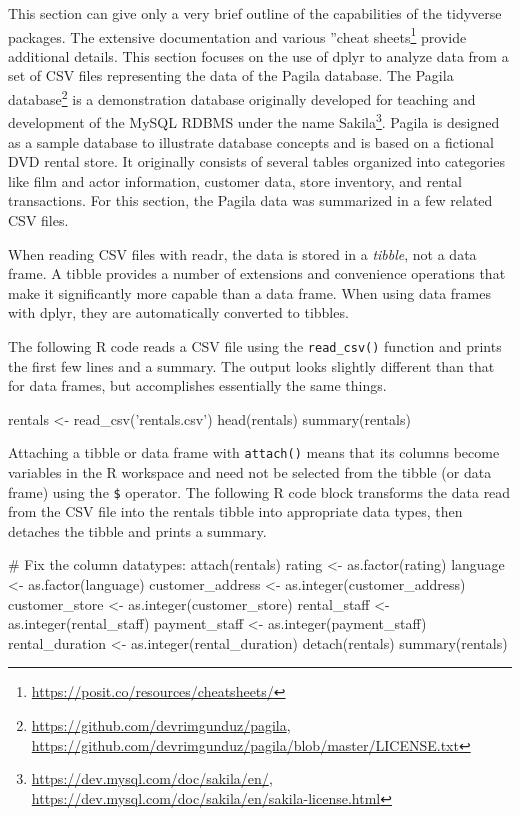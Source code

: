 This section can give only a very brief outline of the capabilities of the tidyverse packages. The extensive documentation and various ''cheat sheets\footnote{\url{https://posit.co/resources/cheatsheets/}} provide additional details. This section focuses on the use of dplyr to analyze data from a set of CSV files representing the data of the Pagila database. The Pagila database\footnote{\url{https://github.com/devrimgunduz/pagila}, \\
\url{https://github.com/devrimgunduz/pagila/blob/master/LICENSE.txt}} is a demonstration database originally developed for teaching and development of the MySQL RDBMS under the name Sakila\footnote{\url{https://dev.mysql.com/doc/sakila/en/}, \\
\url{https://dev.mysql.com/doc/sakila/en/sakila-license.html}}. Pagila is designed as a sample database to illustrate database concepts and is based on a fictional DVD rental store. It originally consists of several tables organized into categories like film and actor information, customer data, store inventory, and rental transactions. For this section, the Pagila data was summarized in a few related CSV files. 

When reading CSV files with readr, the data is stored in a \emph{tibble}, not a data frame. A tibble provides a number of extensions and convenience operations that make it significantly more capable than a data frame. When using data frames with dplyr, they are automatically converted to tibbles. 

The following R code reads a CSV file using the \texttt{read\_csv()} function and prints the first few lines and a summary. The output looks slightly different than that for data frames, but accomplishes essentially the same things.

\begin{samepage}
\begin{Rcode}
rentals <- read_csv('rentals.csv')
head(rentals)
summary(rentals)
\end{Rcode}
\end{samepage}

Attaching a tibble or data frame with \texttt{attach()} means that its columns become variables in the R workspace and need not be selected from the tibble (or data frame) using the \texttt{\$} operator. The following R code block transforms the data read from the CSV file into the rentals tibble into appropriate data types, then detaches the tibble and prints a summary.

\begin{samepage}
\begin{Rcode}
# Fix the column datatypes:
attach(rentals)
rating <- as.factor(rating)
language <- as.factor(language)
customer_address <- as.integer(customer_address)
customer_store <- as.integer(customer_store)
rental_staff <- as.integer(rental_staff)
payment_staff <- as.integer(payment_staff)
rental_duration <- as.integer(rental_duration)
detach(rentals)
summary(rentals)
\end{Rcode}
\end{samepage}

